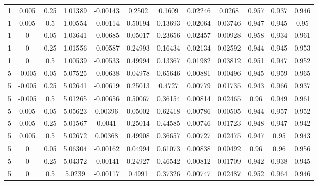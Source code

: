\documentclass{article}
\begin{document}
\begin{table}
\begin{tabular}{cccccccccccc}
1	&0.005	&0.25	&1.01389	&-0.00143	&0.2502	&0.1609	&0.02246	&0.0268	&0.957	&0.937	&0.946\\
1	&0.005	&0.5	&1.00554	&-0.00114	&0.50194	&0.13693	&0.02064	&0.03746	&0.947	&0.945	&0.95\\
1	&0	&0.05	&1.03641	&-0.00685	&0.05017	&0.23656	&0.02457	&0.00928	&0.958	&0.934	&0.961\\
1	&0	&0.25	&1.01556	&-0.00587	&0.24993	&0.16434	&0.02134	&0.02592	&0.944	&0.945	&0.953\\
1	&0	&0.5	&1.00539	&-0.00533	&0.49994	&0.13367	&0.01982	&0.03812	&0.951	&0.947	&0.952\\
5	&-0.005	&0.05	&5.07525	&-0.00638	&0.04978	&0.65646	&0.00881	&0.00496	&0.945	&0.959	&0.965\\
5	&-0.005	&0.25	&5.02641	&-0.00619	&0.25013	&0.4727	&0.00779	&0.01735	&0.943	&0.966	&0.937\\
5	&-0.005	&0.5	&5.01265	&-0.00656	&0.50067	&0.36154	&0.00814	&0.02465	&0.96	&0.949	&0.961\\
5	&0.005	&0.05	&5.05623	&0.00396	&0.05002	&0.62418	&0.00786	&0.00505	&0.944	&0.957	&0.952\\
5	&0.005	&0.25	&5.01567	&0.0041	&0.25014	&0.44585	&0.00746	&0.01723	&0.948	&0.947	&0.942\\
5	&0.005	&0.5	&5.02672	&0.00368	&0.49908	&0.36657	&0.00727	&0.02475	&0.947	&0.95	&0.943\\
5	&0	&0.05	&5.06304	&-0.00162	&0.04994	&0.61073	&0.00838	&0.00492	&0.96	&0.96	&0.956\\
5	&0	&0.25	&5.04372	&-0.00141	&0.24927	&0.46542	&0.00812	&0.01709	&0.942	&0.938	&0.945\\
5	&0	&0.5	&5.0239	&-0.00117	&0.4991	&0.37326	&0.00747	&0.02487	&0.952	&0.964	&0.946\\
  \hline
  \end{tabular}
  \label{tab:simexp}
\end{table}
\clearpage
\end{document}
